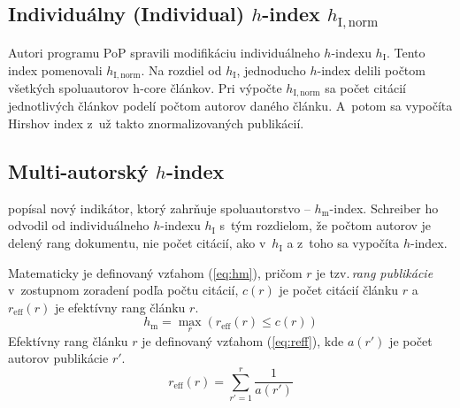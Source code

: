 \subsection{Individuálny (Individual) $h$-index $h_{\mathrm{I, norm}}$}

Autori programu PoP spravili modifikáciu individuálneho
$h$-indexu $h_{\mathrm{I}}$.  Tento index pomenovali $h_{\mathrm{I, norm}}$.  Na
rozdiel od $h_{\mathrm{I}}$, jednoducho $h$-index delili počtom všetkých
spoluautorov h-core článkov.  Pri výpočte $h_{\mathrm{I, norm}}$ sa počet
citácií jednotlivých článkov podelí počtom autorov daného článku.  A~potom sa
vypočíta Hirshov index z~už takto znormalizovaných publikácií.


\subsection{Multi-autorský $h$-index}

\citet{Schreiber2008} popísal nový indikátor, ktorý zahrňuje spoluautorstvo
-- $h_{\mathrm{m}}$-index.  Schreiber ho odvodil od individuálneho $h$-indexu
$h_{\mathrm{I}}$ s~tým rozdielom, že počtom autorov je delený rang dokumentu,
nie počet citácií, ako v~$h_{\mathrm{I}}$ a z~toho sa vypočíta $h$-index.

Matematicky je definovaný vzťahom (\ref{eq:hm}), pričom $r$ je tzv.\,\emph{rang
  publikácie} v~zostupnom zoradení podľa počtu citácií, $c(r)$ je počet citácií
článku $r$ a $r_{\mathrm{eff}}(r)$ je efektívny rang článku $r$.
\begin{equation}
\label{eq:hm}
h_{\mathrm{m}} = \max_r{(r_{\mathrm{eff}}(r) \leq c(r))}
\end{equation}
Efektívny rang článku $r$ je definovaný vzťahom (\ref{eq:reff}), kde $a(r')$ je
počet autorov publikácie $r'$.
\begin{equation}
\label{eq:reff}
r_{\mathrm{eff}}(r) = \sum_{r'=1}^r{\frac{1}{a(r')}}
\end{equation}


